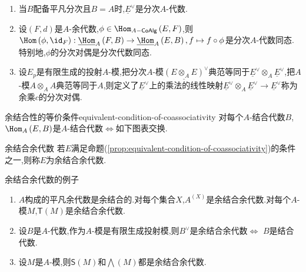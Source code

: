 \begin{remark}{}{}
	\begin{enumerate}
		\item 当$B$配备平凡分次且$B=A$时,$\underline{E}^{\vee}$是分次$A$-代数.
		\item 设$\left(F,d\right)$是$A$-余代数,$\phi\in\Hom_{A-\mathsf{CoAlg}}\left(E,F\right)$,则$\Hom\left(\phi,\id_{F}\right):\underline{\Hom}_{A}\left(F,B\right)\to\underline{\Hom}_{A}\left(E,B\right),f\mapsto f\circ\phi$是分次$A$-代数同态.特别地,$\phi$的分次对偶是分次代数同态.
		\item 设$E_{p}$是有限生成的投射$A$-模,把分次$A$-模$\underline{\left(E\otimes_{A}E\right)}^{\vee}$典范等同于$\underline{E}^{\vee}\otimes_{A}\underline{E}^{\vee}$,把$A$-模$A\otimes_{A}A$典范等同于$A$,则定义了$\underline{E}^{\vee}$上的乘法的线性映射$\underline{E}^{\vee}\otimes_{A}\underline{E}^{\vee}\to\underline{E}^{\vee}$称为余乘$c$的分次对偶.
	\end{enumerate}
\end{remark}

\begin{proposition}{余结合性的等价条件}{equivalent-condition-of-coassociativity}
	对每个$A$-结合代数$B$,$\Hom_{A}\left(E,B\right)$是$A$-结合代数$\iff$如下图表交换.
	\begin{center}
	\end{center}
\end{proposition}

\begin{definition}{余结合余代数}{}
	若$E$满足命题(\cref{prop:equivalent-condition-of-coassociativity})的条件之一,则称$E$为余结合余代数.
\end{definition}

\begin{example}{余结合余代数的例子}{}
	\begin{enumerate}
		\item $A$构成的平凡余代数是余结合的.对每个集合$X$,$A^{\left(X\right)}$是余结合余代数.对每个$A$-模$M$,$\mathsf{T}\left(M\right)$是余结合余代数.
		\item 设$B$是$A$-代数,作为$A$-模是有限生成投射模,则$B^{\vee}$是余结合余代数$\iff$ $B$是结合代数.
		\item 设$M$是$A$-模,则$\mathsf{S}\left(M\right)$和$\bigwedge\left(M\right)$都是余结合余代数.
	\end{enumerate}
\end{example}


